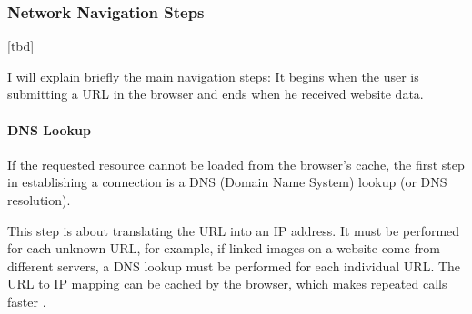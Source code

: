 


\subsubsection{Network Navigation Steps}
\label{subsubsection:network_navigation_steps}


[tbd]

I will explain briefly the main navigation steps: It begins when the user is submitting a URL in the browser and ends when he received website data.







\paragraph{DNS Lookup} %

If the requested resource cannot be loaded from the browser's cache, the first step in establishing a connection is a DNS (Domain Name System) lookup (or DNS resolution).

This step is about translating the URL into an IP address.
It must be performed for each unknown URL, for example, if linked images on a website come from different servers, a DNS lookup must be performed for each individual URL.
The URL to IP mapping can be cached by the browser, which makes repeated calls faster \cite{2021MDNHowBrowsersWork}.

